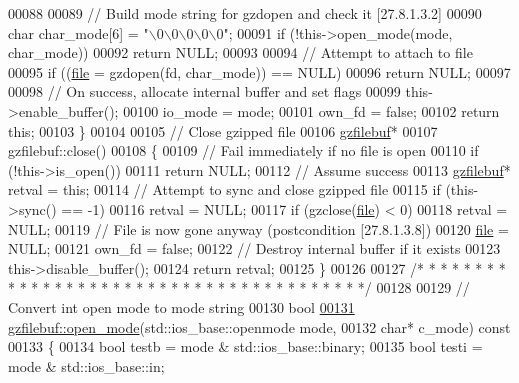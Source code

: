 \begin{DoxyCode}
00088 
00089   \textcolor{comment}{// Build mode string for gzdopen and check it [27.8.1.3.2]}
00090   \textcolor{keywordtype}{char} char\_mode[6] = \textcolor{stringliteral}{"\(\backslash\)0\(\backslash\)0\(\backslash\)0\(\backslash\)0\(\backslash\)0"};
00091   \textcolor{keywordflow}{if} (!this->open\_mode(mode, char\_mode))
00092     \textcolor{keywordflow}{return} NULL;
00093 
00094   \textcolor{comment}{// Attempt to attach to file}
00095   \textcolor{keywordflow}{if} ((\hyperlink{structfile}{file} = gzdopen(fd, char\_mode)) == NULL)
00096     \textcolor{keywordflow}{return} NULL;
00097 
00098   \textcolor{comment}{// On success, allocate internal buffer and set flags}
00099   this->enable\_buffer();
00100   io\_mode = mode;
00101   own\_fd = \textcolor{keyword}{false};
00102   \textcolor{keywordflow}{return} \textcolor{keyword}{this};
00103 \}
00104 
00105 \textcolor{comment}{// Close gzipped file}
00106 \hyperlink{classgzfilebuf}{gzfilebuf}*
00107 gzfilebuf::close()
00108 \{
00109   \textcolor{comment}{// Fail immediately if no file is open}
00110   \textcolor{keywordflow}{if} (!this->is\_open())
00111     \textcolor{keywordflow}{return} NULL;
00112   \textcolor{comment}{// Assume success}
00113   \hyperlink{classgzfilebuf}{gzfilebuf}* retval = \textcolor{keyword}{this};
00114   \textcolor{comment}{// Attempt to sync and close gzipped file}
00115   \textcolor{keywordflow}{if} (this->sync() == -1)
00116     retval = NULL;
00117   \textcolor{keywordflow}{if} (gzclose(\hyperlink{structfile}{file}) < 0)
00118     retval = NULL;
00119   \textcolor{comment}{// File is now gone anyway (postcondition [27.8.1.3.8])}
00120   \hyperlink{structfile}{file} = NULL;
00121   own\_fd = \textcolor{keyword}{false};
00122   \textcolor{comment}{// Destroy internal buffer if it exists}
00123   this->disable\_buffer();
00124   \textcolor{keywordflow}{return} retval;
00125 \}
00126 
00127 \textcolor{comment}{/* * * * * * * * * * * * * * * * * * * * * * * * * * * * * * * * * * * * * * */}
00128 
00129 \textcolor{comment}{// Convert int open mode to mode string}
00130 \textcolor{keywordtype}{bool}
\hyperlink{classgzfilebuf_ab0c2c304183e591706681af26add3da2}{00131} \hyperlink{classgzfilebuf_ab0c2c304183e591706681af26add3da2}{gzfilebuf::open\_mode}(std::ios\_base::openmode mode,
00132                      \textcolor{keywordtype}{char}* c\_mode)\textcolor{keyword}{ const}
00133 \textcolor{keyword}{}\{
00134   \textcolor{keywordtype}{bool} testb = mode & std::ios\_base::binary;
00135   \textcolor{keywordtype}{bool} testi = mode & std::ios\_base::in;

\end{DoxyCode}
